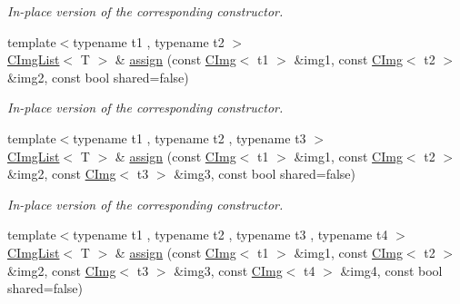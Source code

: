 \begin{DoxyCompactItemize}
\begin{DoxyCompactList}\small\item\em In-\/place version of the corresponding constructor. \item\end{DoxyCompactList}\item 
\hypertarget{structcimg__library_1_1CImgList_afe8d25e995a3d934696796718057b584}{
{\footnotesize template$<$typename t1 , typename t2 $>$ }\\\hyperlink{structcimg__library_1_1CImgList}{CImgList}$<$ T $>$ \& \hyperlink{structcimg__library_1_1CImgList_afe8d25e995a3d934696796718057b584}{assign} (const \hyperlink{structcimg__library_1_1CImg}{CImg}$<$ t1 $>$ \&img1, const \hyperlink{structcimg__library_1_1CImg}{CImg}$<$ t2 $>$ \&img2, const bool shared=false)}
\label{structcimg__library_1_1CImgList_afe8d25e995a3d934696796718057b584}

\begin{DoxyCompactList}\small\item\em In-\/place version of the corresponding constructor. \item\end{DoxyCompactList}\item 
\hypertarget{structcimg__library_1_1CImgList_a546cab2b857ae5a3d50224160a222baf}{
{\footnotesize template$<$typename t1 , typename t2 , typename t3 $>$ }\\\hyperlink{structcimg__library_1_1CImgList}{CImgList}$<$ T $>$ \& \hyperlink{structcimg__library_1_1CImgList_a546cab2b857ae5a3d50224160a222baf}{assign} (const \hyperlink{structcimg__library_1_1CImg}{CImg}$<$ t1 $>$ \&img1, const \hyperlink{structcimg__library_1_1CImg}{CImg}$<$ t2 $>$ \&img2, const \hyperlink{structcimg__library_1_1CImg}{CImg}$<$ t3 $>$ \&img3, const bool shared=false)}
\label{structcimg__library_1_1CImgList_a546cab2b857ae5a3d50224160a222baf}

\begin{DoxyCompactList}\small\item\em In-\/place version of the corresponding constructor. \item\end{DoxyCompactList}\item 
\hypertarget{structcimg__library_1_1CImgList_ab5d15e167713cc7cdf8309223faeceb4}{
{\footnotesize template$<$typename t1 , typename t2 , typename t3 , typename t4 $>$ }\\\hyperlink{structcimg__library_1_1CImgList}{CImgList}$<$ T $>$ \& \hyperlink{structcimg__library_1_1CImgList_ab5d15e167713cc7cdf8309223faeceb4}{assign} (const \hyperlink{structcimg__library_1_1CImg}{CImg}$<$ t1 $>$ \&img1, const \hyperlink{structcimg__library_1_1CImg}{CImg}$<$ t2 $>$ \&img2, const \hyperlink{structcimg__library_1_1CImg}{CImg}$<$ t3 $>$ \&img3, const \hyperlink{structcimg__library_1_1CImg}{CImg}$<$ t4 $>$ \&img4, const bool shared=false)}
\label{structcimg__library_1_1CImgList_ab5d15e167713cc7cdf8309223faeceb4}


\end{DoxyCompactItemize}
